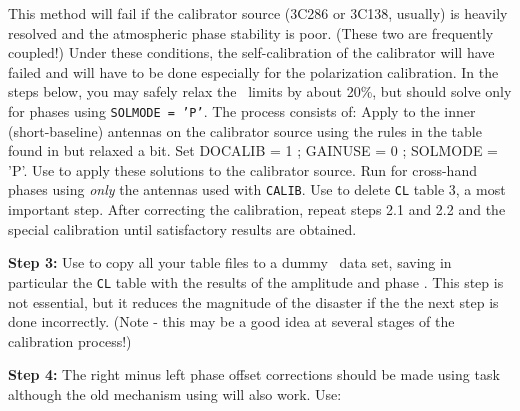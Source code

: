      This method will fail if the calibrator source (3C286 or 3C138,
usually) is heavily resolved and the atmospheric phase stability is
poor.  (These two are frequently coupled!)  Under these conditions,
the self-calibration of the calibrator will have failed and will have
to be done especially for the polarization calibration.  In the steps
below, you may safely relax the \uv\ limits by about 20\%, but should
solve only for phases using {\tt SOLMODE = 'P'}.  The process consists
of:
\xben
\vspace{-7pt}
 Apply {\tt {}} to the inner (short-baseline)
     antennas on the calibrator source using the rules in the table
     found in  but relaxed a bit.  Set {\us DOCALIB = 1
     ; GAINUSE = 0 ; SOLMODE = 'P'}.
 Use {\tt {}} to apply these solutions to the
     calibrator source.
 Run {\tt {}} for cross-hand phases using {\it
     only\/} the antennas used with \hbox{{\tt CALIB}}.
 Use {\tt {}} to delete {\tt CL} table 3, a most
     important step.
\xeen
\vspace{-14pt}
\noindent After correcting the calibration, repeat steps 2.1 and 2.2 and
the special calibration until satisfactory results are obtained.

     {\bf Step 3:} Use {\tt {}} to copy all your table files
to a dummy \uv\ data set, saving in particular the {\tt CL} table with
the results of the amplitude and phase .  This step
is not essential, but it reduces the magnitude of the disaster if the
the next step is done incorrectly.  (Note - this may be a good idea at
several stages of the calibration process!)

     {\bf Step 4:} The right minus left phase offset corrections
should be made using task {\tt {}} although the old
mechanism using {\tt {}} will also work.  Use:

